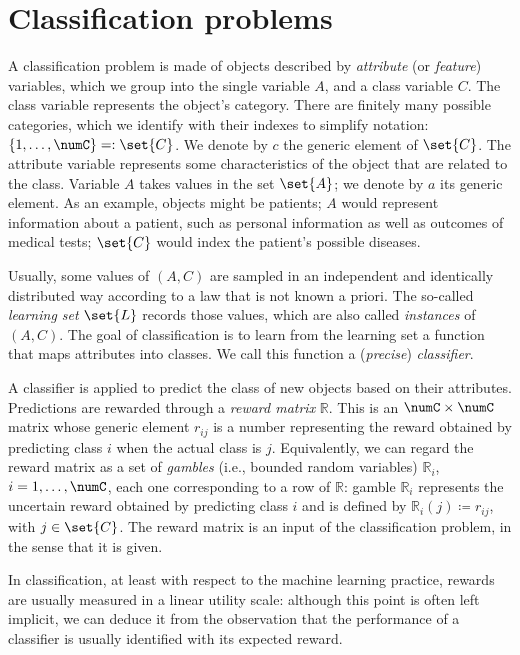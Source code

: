\documentclass[a4paper,10pt,reqno]{amsart}
\theoremstyle{remark}
\begin{document}
\section{Classification problems}\label{sec:theprob}

A classification problem is made of objects described by \emph{attribute} (or \emph{feature}) variables, which we group into the single variable $A$, and a class variable $C$. The class variable represents the object's category. There are finitely many possible categories, which we identify with their indexes to simplify notation: $\{1,\dots,\numC\}=:\set{C}$. We denote by $c$ the generic element of $\set{C}$. The attribute variable represents some characteristics of the object that are related to the class. Variable $A$ takes values in the set $\set{A}$; we denote by $a$ its generic element. As an example, objects might be patients; $A$ would represent information about a patient, such as personal information as well as outcomes of medical tests; $\set{C}$ would index the patient's possible diseases. 

Usually, some values of $(A,C)$ are sampled in an independent and identically distributed way according to a law that is not known a priori. The so-called \emph{learning set} $\set{L}$ records those values, which are also called \emph{instances} of $(A,C)$. The goal of classification is to learn from the learning set a function that maps attributes into classes. We call this function a (\emph{precise}) \emph{classifier}. 

A classifier is applied to predict the class of new objects based on their attributes. Predictions are rewarded through a \emph{reward matrix} $\mathbb{R}$. This is an $\numC\times\numC$ matrix whose generic element $r_{ij}$ is a number representing the reward obtained by predicting class $i$ when the actual class is $j$. Equivalently, we can regard the reward matrix as a set of \emph{gambles} (i.e., bounded random variables) $\mathbb{R}_i$, $i=1,\dots,\numC$, each one corresponding to a row of $\mathbb{R}$: gamble $\mathbb{R}_i$ represents the uncertain reward obtained by predicting class $i$ and is defined by $\mathbb{R}_i(j)\coloneqq r_{ij}$, with $j\in\set{C}$. The reward matrix is an input of the classification problem, in the sense that it is given.

In classification, at least with respect to the machine learning practice, rewards are usually measured in a linear utility scale: although this point is often left implicit, we can deduce it from the observation that the performance of a classifier is usually identified with its expected reward. 
\end{document}
